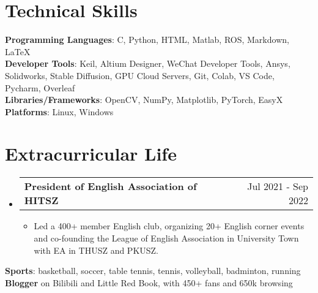 \documentclass[letterpaper,11pt]{article}
\makeatletter
\newcommand{\resumeItem}[1]{
  \item\small{
    {#1 \vspace{-2pt}}
  }
}
\newcommand{\resumeProjectHeading}[2]{
    \item
    \begin{tabular*}{0.97\textwidth}{l@{\extracolsep{\fill}}r}
      \small#1 & #2 \\
    \end{tabular*}\vspace{-7pt}
}
\newcommand{\resumeSubHeadingListStart}{\begin{itemize}[leftmargin=0.15in, label={}]}
\newcommand{\resumeSubHeadingListEnd}{\end{itemize}}
\newcommand{\resumeItemListStart}{\begin{itemize}}
\newcommand{\resumeItemListEnd}{\end{itemize}\vspace{-5pt}}
\makeatother
\begin{document}
\section{Technical Skills}
 \begin{itemize}[leftmargin=0.15in, label={}]
    \small{\item{
     \textbf{Programming Languages}{: C, Python, HTML, Matlab, ROS, Markdown, LaTeX} \\
     \textbf{Developer Tools}{: Keil, Altium Designer, WeChat Developer Tools, Ansys, Solidworks, Stable Diffusion, GPU Cloud Servers, Git, Colab, VS Code, Pycharm, Overleaf} \\
     \textbf{Libraries/Frameworks}{: OpenCV, NumPy, Matplotlib, PyTorch, EasyX} \\
     \textbf{Platforms}{: Linux, Windows}
    }}
 \end{itemize}

\section{Extracurricular Life}
  \resumeSubHeadingListStart
    \resumeProjectHeading
      {\textbf{President of English Association of HITSZ}}{Jul 2021 - Sep 2022}
      \resumeItemListStart
        \resumeItem{Led a 400+ member English club, organizing 20+ English corner events and co-founding the League of English Association in University Town with EA in THUSZ and PKUSZ.}
      \resumeItemListEnd
  \resumeSubHeadingListEnd
 \begin{itemize}[leftmargin=0.15in, label={}]
    \small{\item{
     \textbf{Sports}{: basketball, soccer, table tennis, tennis,  volleyball, badminton, running} \\
     \textbf{Blogger}{ on Bilibili and Little Red Book, with 450+ fans and 650k browsing}
    }}
 \end{itemize}
\end{document}
